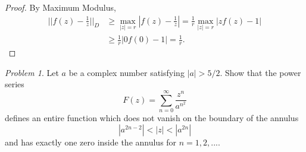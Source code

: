 \documentclass[11pt]{amsart}
\theoremstyle{remark}
\newtheorem{prob}{Problem}[section]
\theoremstyle{definition}
\numberwithin{equation}{section}
\begin{document}
\begin{proof}
    By Maximum Modulus,
    \[
        \begin{aligned}
            \Big|\Big| f(z) - \frac{1}{z} \Big|\Big|_D & \ge \max_{|z| = r} \left|f(z) - \frac{1}z\right| = \frac{1}r \max_{|z| = r} |zf(z) - 1|
            \\
                                                       & \ge \frac{1}r |0f(0) - 1| = \frac{1}r.
        \end{aligned}
    \]
\end{proof}

\begin{prob}
    Let $a$ be a complex number satisfying $|a| > 5/2$. Show that the power series
    \[
        F(z) = \sum_{n=0}^\infty \frac{z^n}{a^{n^2}}
    \]
    defines an entire function which does not vanish on the boundary of the annulus
    \[
        |a^{2n-2}| < |z| < |a^{2n}|
    \]
    and has exactly one zero inside the annulus for $n=1,2,...$.
\end{prob}
\end{document}
